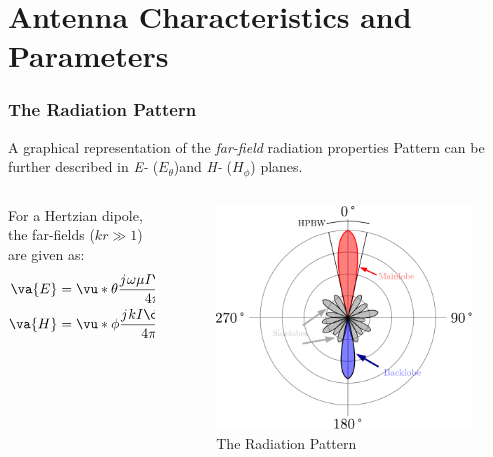 \documentclass[10pt, compress]{beamer}
\renewcommand{\O}{\omega}  %
\renewcommand{\u}{\mu}  %
\renewcommand{\j}{{j}\mkern1mu} %
\begin{document}
\section{Antenna Characteristics and Parameters}


\begin{frame}
  \frametitle{The Radiation Pattern}
\begin{outline}
  \1 A graphical representation of the \textit{far-field} radiation properties
  \1 Pattern can be further described in \textit{E-} ($E_{\theta}$)and \textit{H-} ($H_{\phi}$) planes.
    \begin{columns}[T] %
  \begin{column}{.35\textwidth}
  For a Hertzian dipole, the far-fields ($k r \gg 1$) are given as:
  \begin{align*}
    \va{E}  &= \vu*{\theta} \frac{ \j \O \u I  \dd{l}}{4 \pi r} \sin(\theta) \\
    \va{H}  &= \vu*{\phi} \frac{ \j k I  \dd{l}}{4 \pi r} \sin(\theta) 
  \end{align*}
   \end{column}
 \begin{column}[T]{.65\textwidth}
    \begin{figure}
      \centering
          \includegraphics[width=.9\textwidth]{src/lobes.pdf}
      \caption{The Radiation Pattern}
    \end{figure}
      \end{column}%
\end{columns}
\end{outline}
\end{frame}
\end{document}
